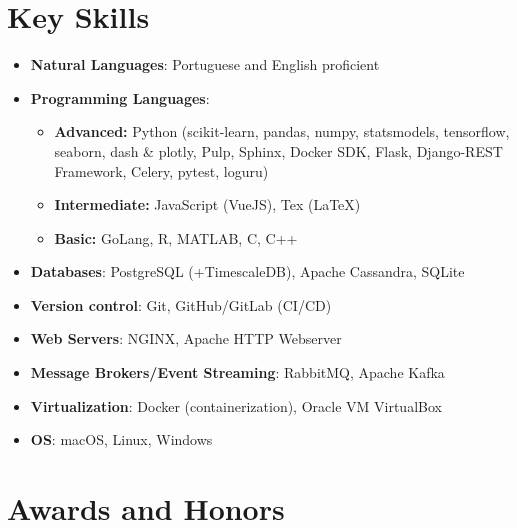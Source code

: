 \documentclass{mycv}
\begin{document}
\vspace{0.4cm}

\section{Key Skills}

\begin{itemize}
	
	\item \textbf{Natural Languages}: Portuguese and English proficient
	
	\item \textbf{Programming Languages}: 
	\begin{itemize}
		\item \textbf{Advanced:} Python (scikit-learn, pandas, numpy, statsmodels, tensorflow, seaborn, dash \& plotly, Pulp, Sphinx, Docker SDK, Flask, Django-REST Framework, Celery, pytest, loguru)
		\item \textbf{Intermediate:} JavaScript (VueJS), Tex (\LaTeX)
		\item \textbf{Basic:} GoLang, R, MATLAB, C, C++
	\end{itemize}			
	
	\item \textbf{Databases}: PostgreSQL (+TimescaleDB), Apache Cassandra, SQLite
	
	\item \textbf{Version control}: Git, GitHub/GitLab (CI/CD)
	
	\item \textbf{Web Servers}: NGINX, Apache HTTP Webserver
	
		\item \textbf{Message Brokers/Event Streaming}: RabbitMQ, Apache Kafka
	
	\item \textbf{Virtualization}: Docker (containerization), Oracle VM VirtualBox
	
	\item \textbf{OS}: macOS, Linux, Windows
	
	
\end{itemize}


\vspace{0.05cm}

\section{Awards and Honors}
\end{document}
